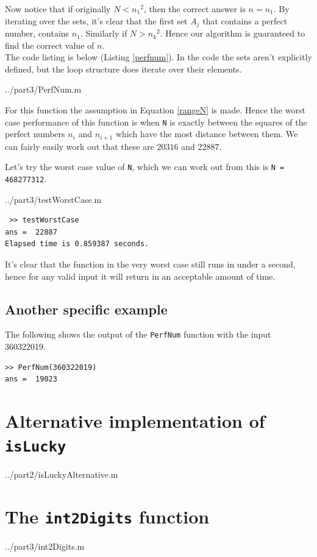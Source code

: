 \documentclass[10pt]{article}
\begin{document}
Now notice that if originally $N < {n_1}^2$, then the correct answer is $n = n_1$. By iterating over the sets, it's clear that the first set $A_j$ that contains a perfect number, contains $n_1$. Similarly if $N > {n_k}^2$. Hence our algorithm is guaranteed to find the correct value of $n$. \\

The code listing is below (Listing \ref{perfnum}). In the code the sets aren't explicitly  defined, but the loop structure does iterate over their elements.

  {../part3/PerfNum.m}
 
For this function the assumption in Equation \ref{rangeN} is made. Hence the worst case performance of this function is when \texttt{N} is exactly between the squares of the perfect numbers $n_i$ and $n_{i+1}$ which have the most distance between them. We can fairly easily work out that these are $20316$ and $22887$. 

Let's try the worst case value of \texttt{N}, which we can work out from this is \texttt{N = 468277312}.

   {../part3/testWorstCase.m}
  
 \begin{verbatim}
 >> testWorstCase
ans =  22887
Elapsed time is 0.859387 seconds.
\end{verbatim}

It's clear that the function in the very worst case still runs in under a second, hence for any valid input it will return in an acceptable amount of time.

\subsection{Another specific example}

The following shows the output of the \texttt{PerfNum} function with the input 360322019.

\begin{verbatim}
>> PerfNum(360322019)
ans =  19023
\end{verbatim}
\begin{appendices}


\section{Alternative implementation of \texttt{isLucky}}\label{islucky_appendix}

   {../part2/isLuckyAlternative.m}
  
\section{The \texttt{int2Digits} function}

   {../part3/int2Digits.m}

\end{appendices}
\end{document}
